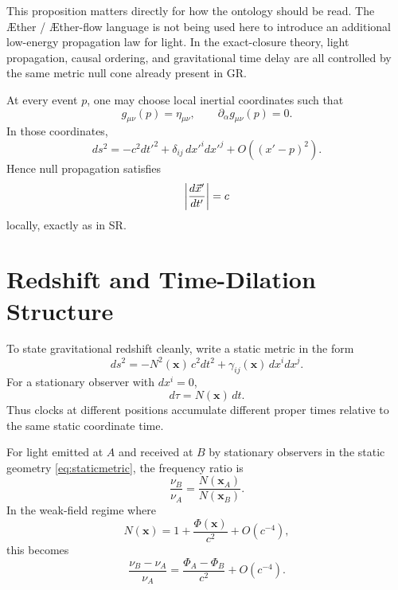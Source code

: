 \documentclass[11pt]{article}
\newcommand{\Aether}{\AE{}ther}
\newcommand{\Aflow}{\AE{}ther-flow}
\begin{document}
This proposition matters directly for how the ontology should be read. The \Aether{} / \Aflow{} language is not being used here to introduce an additional low-energy propagation law for light. In the exact-closure theory, light propagation, causal ordering, and gravitational time delay are all controlled by the same metric null cone already present in GR.

At every event \(p\), one may choose local inertial coordinates such that
\begin{equation}
g_{\mu\nu}(p)=\eta_{\mu\nu},
\qquad
\partial_\alpha g_{\mu\nu}(p)=0.
\label{eq:localinertial}
\end{equation}
In those coordinates,
\begin{equation}
ds^2
=
-c^2dt'^2+\delta_{ij}\,dx'^i dx'^j + O((x'-p)^2).
\label{eq:localminkowski}
\end{equation}
Hence null propagation satisfies
\begin{equation}
\abs{\frac{d\vec x'}{dt'}}=c
\label{eq:localc}
\end{equation}
locally, exactly as in SR.

\section{Redshift and Time-Dilation Structure}

To state gravitational redshift cleanly, write a static metric in the form
\begin{equation}
ds^2=-N^2(\mathbf{x})\,c^2dt^2+\gamma_{ij}(\mathbf{x})\,dx^i dx^j.
\label{eq:staticmetric}
\end{equation}
For a stationary observer with \(dx^i=0\),
\begin{equation}
d\tau = N(\mathbf{x})\,dt.
\label{eq:stationaryclock}
\end{equation}
Thus clocks at different positions accumulate different proper times relative to the same static coordinate time.

For light emitted at \(A\) and received at \(B\) by stationary observers in the static geometry \eqref{eq:staticmetric}, the frequency ratio is
\begin{equation}
\frac{\nu_B}{\nu_A}
=
\frac{N(\mathbf{x}_A)}{N(\mathbf{x}_B)}.
\label{eq:redshift}
\end{equation}
In the weak-field regime where
\begin{equation}
N(\mathbf{x}) = 1+\frac{\Phi(\mathbf{x})}{c^2}+O(c^{-4}),
\label{eq:lapseweakfield}
\end{equation}
this becomes
\begin{equation}
\frac{\nu_B-\nu_A}{\nu_A}
=
\frac{\Phi_A-\Phi_B}{c^2}
+ O(c^{-4}).
\label{eq:weakredshift}
\end{equation}
\end{document}
